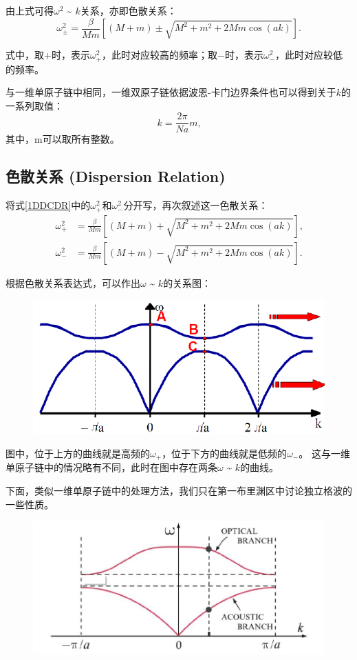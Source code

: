 \documentclass[declarePage]{ecnuthesis}
\begin{document}
由上式可得$\omega^2$ \~{} $k$关系，亦即色散关系：
\begin{equation}
    \omega^2_\pm=\frac{\beta}{Mm}[(M+m)\pm\sqrt{M^2+m^2+2Mm\cos(ak)}] \text{.} \label{1DDCDR}
\end{equation}

式中，取$+$时，表示$\omega_+^2$，此时对应较高的频率；取$-$时，表示$\omega_-^2$，此时对应较低的频率。

与一维单原子链中相同，一维双原子链依据波恩-卡门边界条件也可以得到关于$k$的一系列取值：
\begin{equation}
    k = \frac{2\pi}{Na}m \text{,} \label{1DDCK}
\end{equation}
其中，m可以取所有整数。

\subsection{色散关系 (Dispersion Relation)}

将式\ref{1DDCDR}中的$\omega_+^2$和$\omega_-^2$分开写，再次叙述这一色散关系：
\begin{align}
    \omega^2_+&=\frac{\beta}{Mm}[(M+m)+\sqrt{M^2+m^2+2Mm\cos(ak)}] \text{,}\\
    \omega^2_-&=\frac{\beta}{Mm}[(M+m)-\sqrt{M^2+m^2+2Mm\cos(ak)}] \text{.}
\end{align}

根据色散关系表达式，可以作出$\omega$ \~{} $k$的关系图：
\begin{figure}[htb]
    \centering
    \includegraphics[width=.4\textwidth]{1DDCDR.png}
\end{figure}

图中，位于上方的曲线就是高频的$\omega_+$，位于下方的曲线就是低频的$\omega_-$。%
这与一维单原子链中的情况略有不同，此时在图中存在两条$\omega$ \~{} $k$的曲线。

下面，类似一维单原子链中的处理方法，我们只在第一布里渊区中讨论独立格波的一些性质。
\begin{figure}[htb]
    \centering
    \includegraphics[width=.7\textwidth]{1DDCDR1.png}
     \label{1DDCDR1}
\end{figure}
\end{document}

